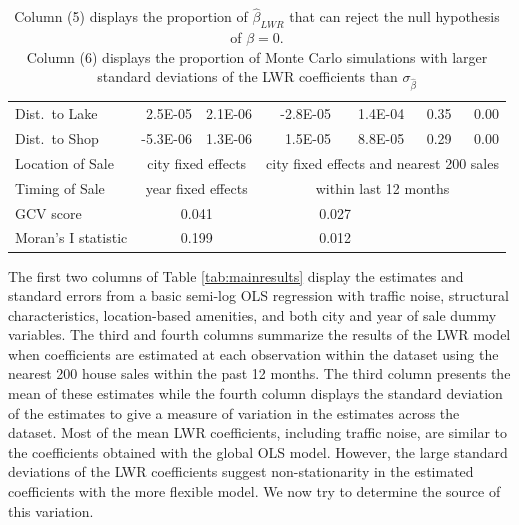 \documentclass{article}\usepackage{graphicx, color}
\begin{document}
\begin{table}[bp]
{\begin{tabular}{lrrrrrr}
  Dist.\ to Lake & 2.5E-05 & 2.1E-06 & -2.8E-05 & 1.4E-04 & 0.35 & 0.00 \\ 
  Dist.\ to Shop & -5.3E-06 & 1.3E-06 & 1.5E-05 & 8.8E-05 & 0.29 & 0.00 \\  
  Location of Sale & \multicolumn{2}{c}{city fixed effects} & \multicolumn{4}{c}{\footnotesize city fixed effects and nearest 200 sales} \\
  Timing of Sale & \multicolumn{2}{c}{year fixed effects} & \multicolumn{4}{c}{within last 12 months} \\
 \hline
  GCV score & \multicolumn{2}{c}{0.041} & \multicolumn{2}{c}{0.027}  &  & \\
  Moran's I statistic & \multicolumn{2}{c}{0.199} & \multicolumn{2}{c}{0.012} & & \\
\end{tabular}
}
 \caption*{\footnotesize Column (5) displays the proportion of $\hat{\beta}_{LWR}$ that can reject the null hypothesis of $\beta =0$.\\ Column (6) displays the proportion of Monte Carlo simulations with larger standard deviations of the LWR coefficients than $\sigma_{\hat{\beta}}$}
\end{table}

The first two columns of Table \ref{tab:mainresults} display the estimates and standard errors from a basic semi-log OLS regression with traffic noise, structural characteristics, location-based amenities, and both city and year of sale dummy variables. The third and fourth columns summarize the results of the LWR model when coefficients are estimated at each observation within the dataset using the nearest 200 house sales within the past 12 months. The third column presents the mean of these estimates while the fourth column displays the standard deviation of the estimates to give a measure of variation in the estimates across the dataset. Most of the mean LWR coefficients, including traffic noise, are similar to the coefficients obtained with the global OLS model. However, the large standard deviations of the LWR coefficients suggest non-stationarity in the estimated coefficients with the more flexible model. We now try to determine the source of this variation.
\end{document}
